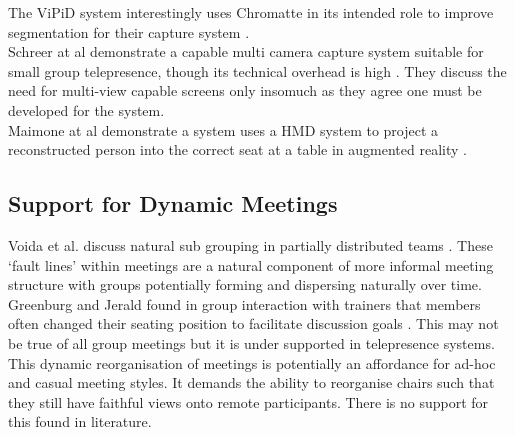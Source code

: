 The ViPiD system interestingly uses Chromatte in its intended role to improve segmentation for their capture system \cite{Klie2006}. \\
Schreer at al demonstrate a capable multi camera capture system suitable for small group telepresence, though its technical overhead is high \cite{Schreer:2008ty}. They discuss the need for multi-view capable screens only insomuch as they agree one must be developed for the system.\\
Maimone at al demonstrate a system uses a HMD system to project a reconstructed person into the correct seat at a table in augmented reality \cite{Maimone2013}.\\
                        

            

\subsection{Support for Dynamic Meetings}
Voida et al. discuss natural sub grouping in partially distributed teams \cite{Voida2012}. These `fault lines' within meetings are a natural component of more informal meeting structure with groups potentially forming and dispersing naturally over time. \\           
Greenburg and Jerald found in group interaction with trainers that members often changed their seating position to facilitate discussion goals \cite{greenberg1976role}. This may not be true of all group meetings but it is under supported in telepresence systems.\\
            This dynamic reorganisation of meetings is potentially an affordance for ad-hoc and casual meeting styles. It demands the ability to reorganise chairs such that they still have faithful views onto remote participants. There is no support for this found in literature.\\
%

